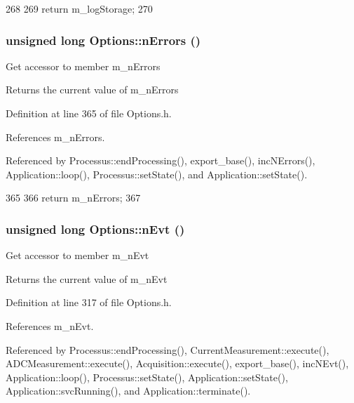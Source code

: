 \begin{DoxyCode}
268                            {
269                 return m_logStorage;
270         }
\end{DoxyCode}
\hypertarget{classOptions_acc6474323f0bbe17fa844e9a086b90b8}{
\subsubsection[{nErrors}]{\setlength{\rightskip}{0pt plus 5cm}unsigned long Options::nErrors ()}}
\label{classOptions_acc6474323f0bbe17fa844e9a086b90b8}
Get accessor to member m\_\-nErrors \begin{DoxyReturn}{Returns}
the current value of m\_\-nErrors 
\end{DoxyReturn}


Definition at line 365 of file Options.h.

References m\_\-nErrors.

Referenced by Processus::endProcessing(), export\_\-base(), incNErrors(), Application::loop(), Processus::setState(), and Application::setState().


\begin{DoxyCode}
365                                  {
366                 return m_nErrors;
367         }
\end{DoxyCode}
\hypertarget{classOptions_ad769b256263a4ac24dd6f989ae724ab7}{
\subsubsection[{nEvt}]{\setlength{\rightskip}{0pt plus 5cm}unsigned long Options::nEvt ()}}
\label{classOptions_ad769b256263a4ac24dd6f989ae724ab7}
Get accessor to member m\_\-nEvt \begin{DoxyReturn}{Returns}
the current value of m\_\-nEvt 
\end{DoxyReturn}


Definition at line 317 of file Options.h.

References m\_\-nEvt.

Referenced by Processus::endProcessing(), CurrentMeasurement::execute(), ADCMeasurement::execute(), Acquisition::execute(), export\_\-base(), incNEvt(), Application::loop(), Processus::setState(), Application::setState(), Application::svcRunning(), and Application::terminate().


